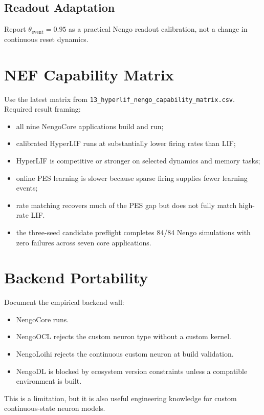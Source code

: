 \documentclass[journal]{IEEEtran}
\begin{document}
\subsection{Readout Adaptation}
Report $\theta_{\mathrm{event}}=0.95$ as a practical Nengo readout calibration, not a change in continuous reset dynamics.

\section{NEF Capability Matrix}
Use the latest matrix from \texttt{13\_hyperlif\_nengo\_capability\_matrix.csv}. Required result framing:
\begin{itemize}
  \item all nine NengoCore applications build and run;
  \item calibrated HyperLIF runs at substantially lower firing rates than LIF;
  \item HyperLIF is competitive or stronger on selected dynamics and memory tasks;
  \item online PES learning is slower because sparse firing supplies fewer learning events;
  \item rate matching recovers much of the PES gap but does not fully match high-rate LIF.
  \item the three-seed candidate preflight completes 84/84 Nengo simulations with zero failures across seven core applications.
\end{itemize}

\section{Backend Portability}
Document the empirical backend wall:
\begin{itemize}
  \item NengoCore runs.
  \item NengoOCL rejects the custom neuron type without a custom kernel.
  \item NengoLoihi rejects the continuous custom neuron at build validation.
  \item NengoDL is blocked by ecosystem version constraints unless a compatible environment is built.
\end{itemize}

This is a limitation, but it is also useful engineering knowledge for custom continuous-state neuron models.
\end{document}
